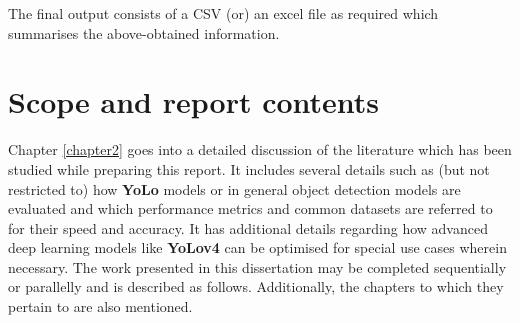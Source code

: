 The final output consists of a CSV (or) an excel file as required which summarises the above-obtained information.

\section{Scope and report contents}

Chapter \ref{chapter2} goes into a detailed discussion of the literature which has been studied while preparing this report. It includes several details such as (but not restricted to) how \textbf{YoLo} models or in general object detection models are evaluated and which performance metrics and common datasets are referred to for their speed and accuracy. It has additional details regarding how advanced deep learning models like \textbf{YoLov4} can be optimised for special use cases wherein necessary. The work presented in this dissertation may be completed sequentially or parallelly and is described as follows. Additionally, the chapters to which they pertain to are also mentioned.


